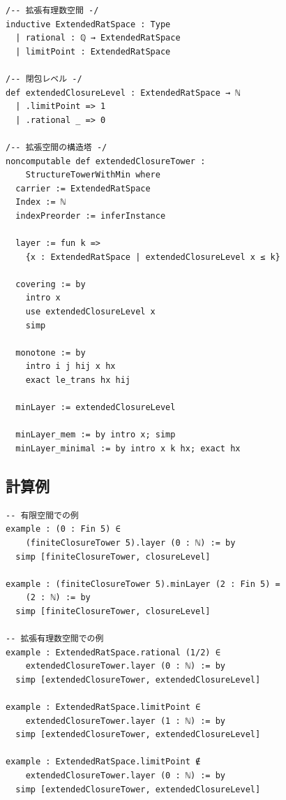 \documentclass[a4paper,12pt]{ltjsarticle}
\theoremstyle{definition}
\begin{document}
\begin{lstlisting}[language=Lean]
/-- 拡張有理数空間 -/
inductive ExtendedRatSpace : Type
  | rational : ℚ → ExtendedRatSpace
  | limitPoint : ExtendedRatSpace

/-- 閉包レベル -/
def extendedClosureLevel : ExtendedRatSpace → ℕ
  | .limitPoint => 1
  | .rational _ => 0

/-- 拡張空間の構造塔 -/
noncomputable def extendedClosureTower :
    StructureTowerWithMin where
  carrier := ExtendedRatSpace
  Index := ℕ
  indexPreorder := inferInstance

  layer := fun k =>
    {x : ExtendedRatSpace | extendedClosureLevel x ≤ k}

  covering := by
    intro x
    use extendedClosureLevel x
    simp

  monotone := by
    intro i j hij x hx
    exact le_trans hx hij

  minLayer := extendedClosureLevel

  minLayer_mem := by intro x; simp
  minLayer_minimal := by intro x k hx; exact hx
\end{lstlisting}

\subsection{計算例}

\begin{lstlisting}[language=Lean]
-- 有限空間での例
example : (0 : Fin 5) ∈
    (finiteClosureTower 5).layer (0 : ℕ) := by
  simp [finiteClosureTower, closureLevel]

example : (finiteClosureTower 5).minLayer (2 : Fin 5) =
    (2 : ℕ) := by
  simp [finiteClosureTower, closureLevel]

-- 拡張有理数空間での例
example : ExtendedRatSpace.rational (1/2) ∈
    extendedClosureTower.layer (0 : ℕ) := by
  simp [extendedClosureTower, extendedClosureLevel]

example : ExtendedRatSpace.limitPoint ∈
    extendedClosureTower.layer (1 : ℕ) := by
  simp [extendedClosureTower, extendedClosureLevel]

example : ExtendedRatSpace.limitPoint ∉
    extendedClosureTower.layer (0 : ℕ) := by
  simp [extendedClosureTower, extendedClosureLevel]
\end{lstlisting}
\end{document}

